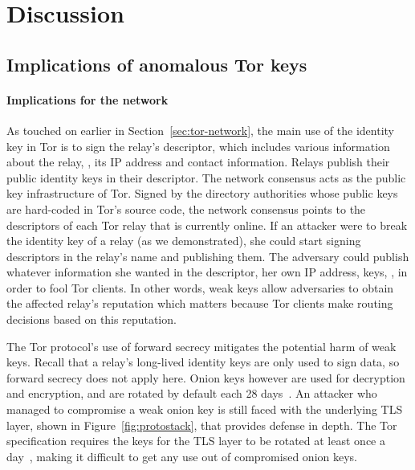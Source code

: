 \section{Discussion}
\label{sec:discussion}
\subsection{Implications of anomalous Tor keys}
\paragraph{Implications for the network}
As touched on earlier in Section~\ref{sec:tor-network}, the main use of the
identity key in Tor is to sign the relay's descriptor, which includes various
information about the relay, \eg, its IP address and contact information.
Relays publish their public identity keys in their descriptor.  The network
consensus acts as the public key infrastructure of Tor.  Signed by the directory
authorities whose public keys are hard-coded in Tor's source code, the network
consensus points to the descriptors of each Tor relay that is currently online.
If an attacker were to break the identity key of a relay (as we demonstrated),
she could start signing descriptors in the relay's name and publishing them. The
adversary could publish whatever information she wanted in the descriptor, \eg
her own IP address, keys, \etc, in order to fool Tor clients.  In other words,
weak keys allow adversaries to obtain the affected relay's reputation which
matters because Tor clients make routing decisions based on this reputation.

The Tor protocol's use of forward secrecy mitigates the potential harm of weak
keys.  Recall that a relay's long-lived identity keys are only used to sign
data, so forward secrecy does not apply here.  Onion keys however are used for
decryption and encryption, and are rotated by default each 28
days~\cite[\S~3.4.1]{dir-spec}.  An attacker who managed to compromise a weak
onion key is still faced with the underlying TLS layer, shown in
Figure~\ref{fig:protostack}, that provides defense in depth.  The Tor
specification requires the keys for the TLS layer to be rotated at least once a
day~\cite[\S~1.1]{torspec}, making it difficult to get any use out of
compromised onion keys.

